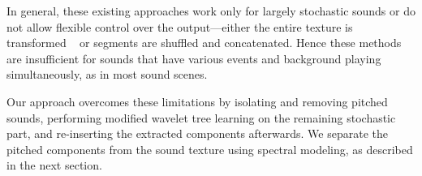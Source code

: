 \documentclass{acmsiggraph}               %
\begin{document}
In general, these existing approaches work only for largely stochastic sounds or 
do not allow flexible control over the output---either the entire texture is 
transformed ~\cite{Miner97} or segments are shuffled and concatenated. Hence 
these methods are insufficient for sounds that have various events and background 
playing simultaneously, as in most sound scenes.

Our approach overcomes these limitations by isolating and removing 
pitched sounds, performing modified wavelet tree learning on the  
remaining stochastic part, and re-inserting the extracted components 
afterwards.  We separate the pitched components from the sound texture 
using spectral modeling, as described in the next section.



\end{document}

